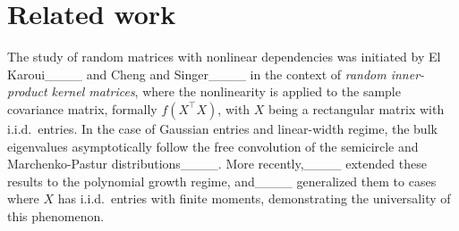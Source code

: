 \section{Related work}
The study of random matrices with nonlinear dependencies was initiated by El Karoui____ and Cheng and Singer____ in the context of \emph{random inner-product kernel matrices}, where the nonlinearity is applied to the sample covariance matrix, formally \( f (X^\top X)\), with \(X\) being a rectangular matrix with i.i.d.\ entries. In the case of Gaussian entries and linear-width regime, the bulk eigenvalues asymptotically follow the free convolution of the semicircle and Marchenko-Pastur distributions____. More recently,____ extended these results to the polynomial growth regime, and____ generalized them to cases where \(X\) has i.i.d.\ entries with finite moments, demonstrating the universality of this phenomenon.

